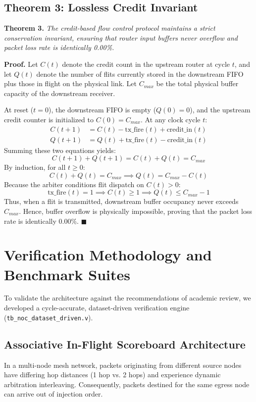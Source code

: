 \documentclass[conference]{IEEEtran}
\begin{document}
\subsection{Theorem 3: Lossless Credit Invariant}
\textbf{Theorem 3.} \textit{The credit-based flow control protocol maintains a strict conservation invariant, ensuring that router input buffers never overflow and packet loss rate is identically 0.00\%.}

\textbf{Proof.} Let $C(t)$ denote the credit count in the upstream router at cycle $t$, and let $Q(t)$ denote the number of flits currently stored in the downstream FIFO plus those in flight on the physical link. Let $C_{max}$ be the total physical buffer capacity of the downstream receiver.

At reset ($t = 0$), the downstream FIFO is empty ($Q(0) = 0$), and the upstream credit counter is initialized to $C(0) = C_{max}$. At any clock cycle $t$:
\begin{align}
    C(t+1) &= C(t) - \text{tx\_fire}(t) + \text{credit\_in}(t) \\
    Q(t+1) &= Q(t) + \text{tx\_fire}(t) - \text{credit\_in}(t)
\end{align}
Summing these two equations yields:
\begin{equation}
    C(t+1) + Q(t+1) = C(t) + Q(t) = C_{max}
\end{equation}
By induction, for all $t \ge 0$:
\begin{equation}
    C(t) + Q(t) = C_{max} \implies Q(t) = C_{max} - C(t)
\end{equation}
Because the arbiter conditions flit dispatch on $C(t) > 0$:
\begin{equation}
    \text{tx\_fire}(t) = 1 \implies C(t) \ge 1 \implies Q(t) \le C_{max} - 1
\end{equation}
Thus, when a flit is transmitted, downstream buffer occupancy never exceeds $C_{max}$. Hence, buffer overflow is physically impossible, proving that the packet loss rate is identically 0.00\%. $\blacksquare$

\section{Verification Methodology and Benchmark Suites}
\label{sec:verif}
To validate the architecture against the recommendations of academic review, we developed a cycle-accurate, dataset-driven verification engine (\texttt{tb\_noc\_dataset\_driven.v}).

\subsection{Associative In-Flight Scoreboard Architecture}
In a multi-node mesh network, packets originating from different source nodes have differing hop distances (1 hop vs. 2 hops) and experience dynamic arbitration interleaving. Consequently, packets destined for the same egress node can arrive out of injection order.
\end{document}
